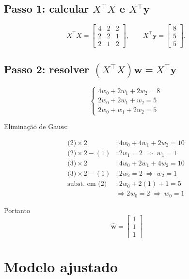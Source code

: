 \documentclass[12pt]{article}
\begin{document}
\subsection*{Passo 1: calcular $X^{\!\top}X$ e $X^{\!\top}\bm{y}$}

\[
X^{\!\top}X =
\begin{bmatrix}
4 & 2 & 2\\
2 & 2 & 1\\
2 & 1 & 2
\end{bmatrix},\qquad
X^{\!\top}\bm{y} =
\begin{bmatrix}
8\\5\\5
\end{bmatrix}.
\]

\subsection*{Passo 2: resolver $(X^{\!\top}X)\bm{w}=X^{\!\top}\bm{y}$}

\[
\begin{cases}
4w_0 + 2w_1 + 2w_2 = 8 \\
2w_0 + 2w_1 +   w_2 = 5 \\
2w_0 +   w_1 + 2w_2 = 5
\end{cases}
\]

Eliminação de Gauss:

\[
\begin{aligned}
\text{(2)}\times 2 &: 4w_0 + 4w_1 + 2w_2 = 10 \\
\text{(2)}\times 2 - (1) &: 2w_1 = 2 \;\Rightarrow\; w_1 = 1 \\[6pt]
\text{(3)}\times 2 &: 4w_0 + 2w_1 + 4w_2 = 10 \\
\text{(3)}\times 2 - (1) &: 2w_2 = 2 \;\Rightarrow\; w_2 = 1 \\[6pt]
\text{subst. em (2)} &: 2w_0 + 2(1) + 1 = 5 \\
&\Rightarrow 2w_0 = 2 \;\Rightarrow\; w_0 = 1
\end{aligned}
\]

Portanto
\[
\boxed{\;
\hat{\bm{w}} =
\begin{bmatrix}
1 \\ 1 \\ 1
\end{bmatrix}}
\]

\section{Modelo ajustado}
\end{document}
